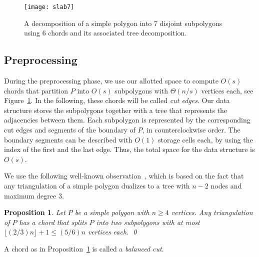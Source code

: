 \documentclass[11pt,a4paper]{article}
\newtheorem{proposition}[theorem]{Proposition}
\begin{document}
\begin{figure}[htbp]
\centerline{\texttt{[image: slab7]}}
\caption{A decomposition of a simple polygon into
$7$ disjoint subpolygons using $6$ chords and its
associated tree decomposition.}
\label{fig:slab7}
\end{figure}

\subsection{Preprocessing}
During the preprocessing phase, we use our allotted space to
compute $O(s)$ chords that partition $P$ into $O(s)$ subpolygons with
$\Theta(n/s)$ vertices each, see Figure~\ref{fig:slab7}.
In the following, these chords will be called
\emph{cut edges}. Our data structure stores the subpolygons
together with a tree that represents the adjacencies between them.
Each subpolygon is represented by the corresponding cut edges and segments of
the boundary of $P$, in counterclockwise order. The boundary segments
can be described with $O(1)$ storage cells each, by using
the index of the first and the last edge. Thus, the total
space for the data structure is $O(s)$.



We use the following well-known observation~\cite{Chazelle82},
which is based on the fact that
any triangulation of a simple polygon dualizes to a tree with
$n-2$ nodes and
maximum degree $3$.
 \begin{proposition}
\label{prop:cut}
   Let $P$ be a simple polygon with $n \geq 4$ vertices.
   Any triangulation of $P$ has a chord that splits $P$ into
   two subpolygons with at most
   $\lfloor (2/3)n\rfloor + 1 \leq (5/6) n$ vertices each.
\qed
 \end{proposition}

A chord as in Proposition~\ref{prop:cut} is called a \emph{balanced cut}.
\end{document}
